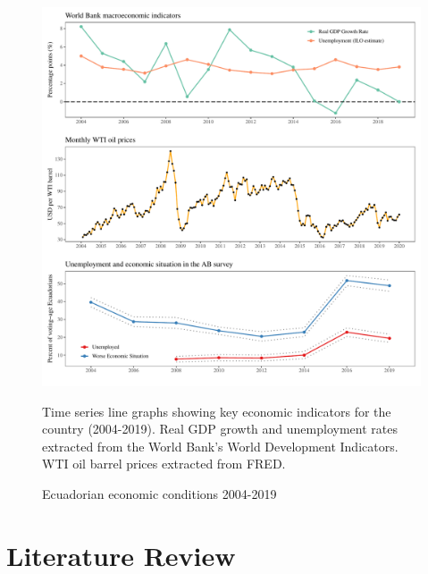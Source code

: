 \documentclass[12pt,a4]{article}\usepackage[]{graphicx}\usepackage[]{xcolor}
\makeatletter
\def\maxwidth{ %
  \ifdim\Gin@nat@width>\linewidth
    \linewidth
  \else
    \Gin@nat@width
  \fi
}
\newenvironment{knitrout}{}{} %
\makeatother
\begin{document}
\begin{figure}[htbp!]
\begin{center}
\begin{knitrout}
\color{fgcolor}

{\centering \includegraphics[width=\maxwidth]{figure/econ_graph-1} 

}


\end{knitrout}
\caption{Ecuadorian economic conditions 2004-2019}
\label{fig:ecua_ec}
Time series line graphs showing key economic indicators for the country (2004-2019). Real GDP growth and unemployment rates extracted from the World Bank's World Development Indicators. WTI oil barrel prices extracted from FRED.
\end{center}
\end{figure}





\section{Literature Review}
\end{document}
